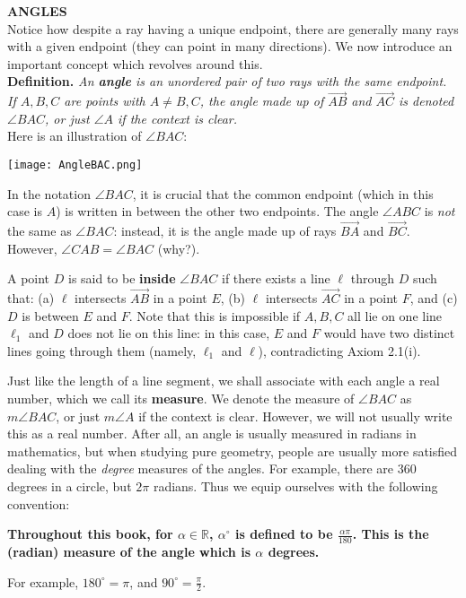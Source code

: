 \documentclass[leqno]{book}
\begin{document}
\noindent\textbf{ANGLES}\\

\noindent Notice how despite a ray having a unique endpoint, there are generally many rays with a given endpoint (they can point in many directions).  We now introduce an important concept which revolves around this.\\

\noindent\textbf{Definition.} \emph{An \textbf{angle} is an unordered pair of two rays with the same endpoint.  If $A,B,C$ are points with $A\ne B,C$, the angle made up of $\overset{\longrightarrow}{AB}$ and $\overset{\longrightarrow}{AC}$ is denoted $\angle BAC$, or just $\angle A$ if the context is clear.}\\

\noindent Here is an illustration of $\angle BAC$:
\begin{center}\texttt{[image: AngleBAC.png]}\end{center}
In the notation $\angle BAC$, it is crucial that the common endpoint (which in this case is $A$) is written in between the other two endpoints.  The angle $\angle ABC$ is \emph{not} the same as $\angle BAC$: instead, it is the angle made up of rays $\overset{\longrightarrow}{BA}$ and $\overset{\longrightarrow}{BC}$.  However, $\angle CAB=\angle BAC$ (why?).

A point $D$ is said to be \textbf{inside} $\angle BAC$ if there exists a line $\ell$ through $D$ such that: (a) $\ell$ intersects $\overset{\longrightarrow}{AB}$ in a point $E$, (b) $\ell$ intersects $\overset{\longrightarrow}{AC}$ in a point $F$, and (c) $D$ is between $E$ and $F$.  Note that this is impossible if $A,B,C$ all lie on one line $\ell_1$ and $D$ does not lie on this line: in this case, $E$ and $F$ would have two distinct lines going through them (namely, $\ell_1$ and $\ell$), contradicting Axiom 2.1(i).

Just like the length of a line segment, we shall associate with each angle a real number, which we call its \textbf{measure}.  We denote the measure of $\angle BAC$ as $m\angle BAC$, or just $m\angle A$ if the context is clear.  However, we will not usually write this as a real number.  After all, an angle is usually measured in radians in mathematics, but when studying pure geometry, people are usually more satisfied dealing with the \emph{degree} measures of the angles.  For example, there are $360$ degrees in a circle, but $2\pi$ radians.  Thus we equip ourselves with the following convention:
\begin{center}
\textbf{Throughout this book, for $\alpha\in\mathbb R$, $\alpha^\circ$ is defined to be $\frac{\alpha\pi}{180}$.  This is the (radian) measure of the angle which is $\alpha$ degrees.}
\end{center}
For example, $180^\circ=\pi$, and $90^\circ=\frac{\pi}2$.\\
\end{document}

